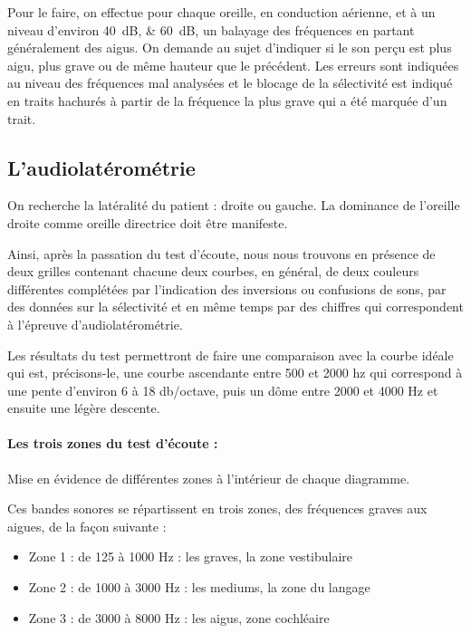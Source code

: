 Pour le faire, on effectue pour chaque oreille, en conduction
aérienne, et à un niveau d'environ \SIlist{40;60}{\dB}, un balayage des
fréquences en partant généralement des aigus. On demande au sujet
d'indiquer si le son perçu est plus aigu, plus grave ou de même hauteur
que le précédent. Les erreurs sont indiquées au niveau des fréquences
mal analysées et le blocage de la sélectivité est indiqué en traits
hachurés à partir de la fréquence la plus grave qui a été marquée
d'un trait. 
\subsection{L'audiolatérométrie}

On recherche la latéralité du patient : droite ou gauche. La dominance
de l'oreille droite comme oreille directrice doit être manifeste.

Ainsi, après la passation du test d\textquoteright écoute, nous nous
trouvons en présence de deux grilles contenant chacune deux courbes,
en général, de deux couleurs différentes complétées par l'indication
des inversions ou confusions de sons, par des données sur la sélectivité
et en même temps par des chiffres qui correspondent à l'épreuve d'audiolatérométrie.




Les résultats du test permettront de faire une comparaison avec la
courbe idéale qui est, précisons-le, une courbe ascendante entre 500 et 2000
hz qui correspond à une pente d\textquoteright environ 6 à 18 db/octave,
puis un dôme entre 2000 et 4000 Hz et ensuite une légère descente. 

\paragraph{Les trois zones du test d'écoute : }

Mise en évidence de différentes zones à l\textquoteright intérieur
de chaque diagramme. 

Ces bandes sonores se répartissent en trois zones, des fréquences
graves aux aigues, de la façon suivante :
\begin{itemize}
\item Zone 1 : de 125 à 1000 Hz : les graves, la zone vestibulaire
\item Zone 2 : de 1000 à 3000 Hz : les mediums, la zone du langage
\item Zone 3 : de 3000 à 8000 Hz : les aigus, zone cochléaire
\end{itemize}

